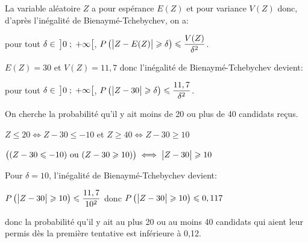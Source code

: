 \begin{enumerate}
\begin{enumerate}
La variable aléatoire $Z$ a pour espérance $E(Z)$ et pour variance $V(Z)$ donc, d'après l'inégalité de Bienaymé-Tchebychev, on a:

pour tout $\delta\in\, \left ]0\;;\;+\infty\strut \right [$, $P\left ( \left |Z-E(Z)\strut \right | \geqslant \delta \right ) \leqslant \dfrac{V(Z)}{\delta^2}$.

$E(Z)=30$ et $V(Z)=11,7$ donc  l'inégalité de Bienaymé-Tchebychev devient:

pour tout $\delta\in\, \left ]0\;;\;+\infty\strut \right [$, $P\left ( \left |Z-30\strut \right | \geqslant \delta \right ) \leqslant \dfrac{11,7}{\delta^2}$.

On cherche la probabilité qu'il y ait moins de 20  ou plus de 40 candidats reçus.

$ Z\leqslant 20 \iff Z-30 \leqslant -10$ et $Z \geqslant 40 \iff Z-30 \geqslant 10$

$\left ( (Z-30 \leqslant -10) \text{ ou } (Z-30 \geqslant 10) \strut \right )\iff \left |Z-30 \strut \right | \geqslant 10$

Pour $\delta=10$, l'inégalité de Bienaymé-Tchebychev devient:

$P\left ( \left |Z-30\strut \right | \geqslant 10 \right ) \leqslant \dfrac{11,7}{10^2}$
donc
$P\left ( \left |Z-30\strut \right | \geqslant 10 \right ) \leqslant 0,117$

donc la probabilité qu'il y ait au plus 20 ou au moins 40 candidats qui aient leur permis dès la première tentative est inférieure à 0,12.
			\end{enumerate}
		\end{enumerate}

\bigskip
